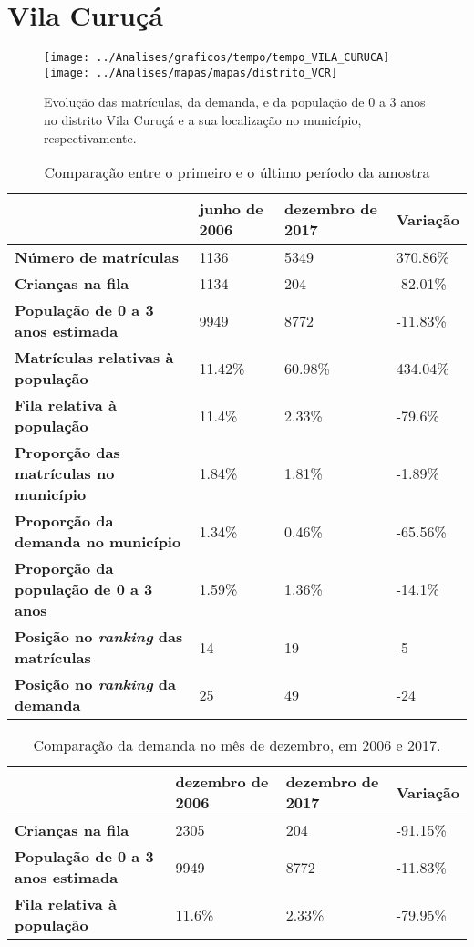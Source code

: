 \section{Vila Curuçá}
\begin{figure}[H]
\centering
\texttt{[image: ../Analises/graficos/tempo/tempo\_VILA\_CURUCA]}
\texttt{[image: ../Analises/mapas/mapas/distrito\_VCR]}
\caption{Evolução das matrículas, da demanda, e da população de 0 a 3 anos no distrito Vila Curuçá e a sua localização no município, respectivamente.}
\end{figure}
\begin{table}[H]
\begin{tabular}{l|l|l|l}
\textbf{}                                      & \textbf{junho de 2006}       & \textbf{dezembro de 2017}    & \textbf{Variação} \\ \hline
\textbf{Número de matrículas}                  & 1136 & 5349 & 370.86\% \\ \hline
\textbf{Crianças na fila}                      & 1134 & 204 & -82.01\% \\ \hline
\textbf{População de 0 a 3 anos estimada}      & 9949 & 8772 & -11.83\% \\ \hline
\textbf{Matrículas relativas à população}      & 11.42\% & 60.98\% & 434.04\% \\ \hline
\textbf{Fila relativa à população}             & 11.4\% & 2.33\% & -79.6\% \\ \hline
\textbf{Proporção das matrículas no município} & 1.84\% & 1.81\% & -1.89\% \\ \hline
\textbf{Proporção da demanda no município}     & 1.34\% & 0.46\% & -65.56\% \\ \hline
\textbf{Proporção da população de 0 a 3 anos}  & 1.59\% & 1.36\% & -14.1\% \\ \hline
\textbf{Posição no \textit{ranking} das matrículas}     & 14 & 19 & -5 \\ \hline
\textbf{Posição no \textit{ranking} da demanda}         & 25 & 49 & -24 \\ 
\end{tabular}
\caption{Comparação entre o primeiro e o último período da amostra}
\end{table}
\begin{table}[H]
\begin{tabular}{l|l|l|l}
\textbf{}                                 & \textbf{dezembro de 2006} & \textbf{dezembro de 2017} & \textbf{Variação} \\ \hline
\textbf{Crianças na fila}                      & 2305 & 204 & -91.15\% \\ \hline
\textbf{População de 0 a 3 anos estimada}      & 9949 & 8772 & -11.83\% \\ \hline
\textbf{Fila relativa à população}             & 11.6\% & 2.33\% & -79.95\% \\
\end{tabular}
\caption{Comparação da demanda no mês de dezembro, em 2006 e 2017.}
\end{table}

